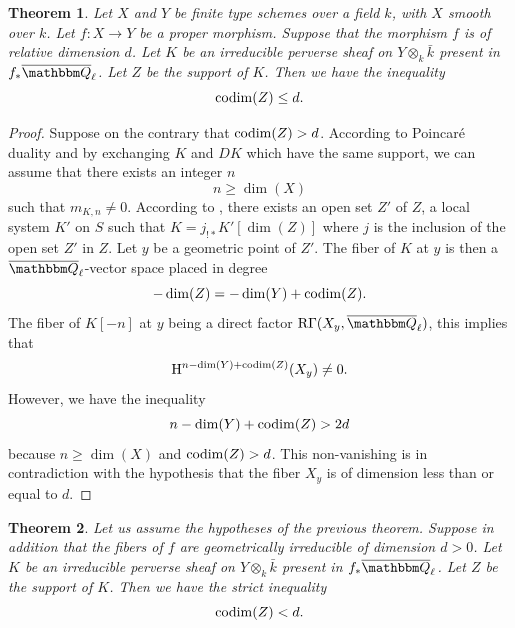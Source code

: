 \documentclass[12pt,english]{smfart}
\numberwithin{equation}{subsection}
\newtheorem{apptheoreme}{Theorem}
\theoremstyle{remark}
\newcommand\rta{\rightarrow}
\newcommand\QQ{{\mathbbm Q}}
\newcommand\rmH{{\rm H}}
\newcommand\rmR{{\rm R}}
\newcommand\Ql{{\overline\QQ_\ell}}
\begin{document}
\begin{apptheoreme}\label{inegalite de codim}
Let $X$ and $Y$ be finite type schemes over a field $k$, with $X$ smooth
over $k$. Let $f:X\rta Y$ be a proper morphism. Suppose that the morphism
$f$ is of relative dimension $d$. Let $K$ be an irreducible perverse sheaf
on $Y\otimes_k \bar k$ present in $f_*\Ql$. Let $Z$ be the
support of $K$. Then we have the inequality
$${\rm codim}(Z)\leq d.$$
\end{apptheoreme}

\begin{proof}
Suppose on the contrary that ${\rm codim}(Z)>d$. According to Poincar\'{e}
duality and by exchanging $K$ and $DK$ which have the same support,
we can assume that there exists an integer $n$
$$n\geq\dim(X)$$
such that $m_{K,n}\not=0$. According to \cite{BBD}, there exists an open set $Z'$ of
$Z$, a local system $K'$ on $S$ such that $K=j_{! *} K' [\dim(Z)]$ where
$j$ is the inclusion of the open set $Z'$ in $Z$. Let $y$ be a geometric point
of $Z'$. The fiber of $K$ at $y$ is then a $\Ql$-vector space
placed in degree
$$-\dim(Z)=-\dim(Y)+{\rm codim}(Z).$$
The fiber of $K[-n]$ at $y$ being a direct factor $\rmR\Gamma(X_y,\Ql)$, this implies that
$$\rmH^{n-\dim(Y)+{\rm codim}(Z)}(X_y)\not=0.$$
However, we have the inequality
$$n-\dim(Y)+{\rm codim}(Z) > 2d$$
because $n\geq\dim(X)$ and ${\rm codim}(Z) >d$. This non-vanishing is
in contradiction with the hypothesis that the fiber $X_y$ is of dimension
less than or equal to $d$.
\end{proof}

\begin{apptheoreme}\label{inegalite stricte de codim}
Let us assume the hypotheses of the previous theorem.
Suppose in addition that the fibers of $f$ are geometrically
irreducible of dimension $d>0$. Let $K$ be an irreducible perverse sheaf
on $Y\otimes_k \bar k$ present in $f_*\Ql$. Let $Z$ be the
support of $K$. Then we have the strict inequality
$${\rm codim}(Z)<d.$$
\end{apptheoreme}
\end{document}
